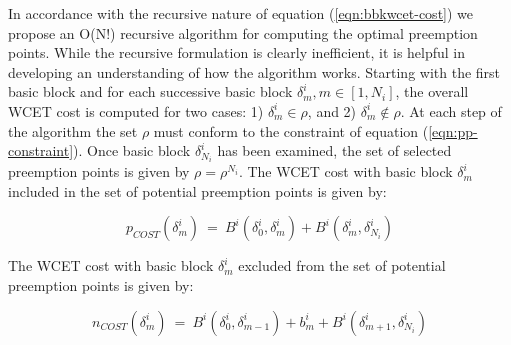 \noindent
In accordance with the recursive nature of equation (\ref{eqn:bbkwcet-cost}) we propose an O(N!) recursive algorithm for computing the optimal preemption points.  While the recursive formulation is clearly inefficient, it is helpful in developing an understanding of how the algorithm works.  Starting with the first basic block and for each successive basic block \begin{math}\delta_{m}^{i}, m \in [1,N_{i}]\end{math}, the overall WCET cost is computed for two cases: 1) \begin{math}\delta_{m}^{i} \in \rho\end{math}, and 2) \begin{math}\delta_{m}^{i} \not\in \rho\end{math}.  At each step of the algorithm the set \begin{math}\rho\end{math} must conform to the constraint of equation (\ref{eqn:pp-constraint}).  Once basic block \begin{math}\delta_{N_{i}}^{i}\end{math} has been examined, the set of selected preemption points is given by \begin{math}\rho = \rho^{N_{i}}\end{math}.  The WCET cost with basic block \begin{math}\delta_{m}^{i}\end{math} included in the set of potential preemption points is given by:

\begin{equation}\label{eqn:pcost-bb}
p_{COST}(\delta_{m}^{i})\ =\ B^{i}(\delta_{0}^{i},\delta_{m}^{i}) + B^{i}(\delta_{m}^{i},\delta_{N_{i}}^{i})
\end{equation}

The WCET cost with basic block \begin{math}\delta_{m}^{i}\end{math} excluded from the set of potential preemption points is given by:

\begin{equation}\label{eqn:npcost-bb}
n_{COST}(\delta_{m}^{i})\ =\ B^{i}(\delta_{0}^{i},\delta_{m-1}^{i}) + b_{m}^{i} + B^{i}(\delta_{m+1}^{i},\delta_{N_{i}}^{i})
\end{equation}

